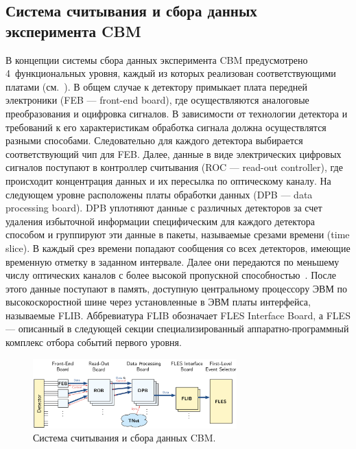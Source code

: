 \subsection{Система считывания и сбора данных эксперимента CBM}\label{sec:CBMreadout}

В концепции системы сбора данных эксперимента CBM предусмотрено 4~функциональных уровня, каждый из которых реализован соответствующими платами (см.~). В общем случае к детектору примыкает плата передней электроники (FEB --- front-end board), где осуществляются аналоговые преобразования и оцифровка сигналов.
В зависимости от технологии детектора и требований к его характеристикам обработка сигнала должна осуществлятся разными способами. Следовательно для каждого детектора выбирается соответствующий чип для FEB.
Далее, данные в виде электрических цифровых сигналов поступают в контроллер считывания (ROC --- read-out controller), где происходит концентрация данных и их пересылка по оптическому каналу. На следующем уровне расположены платы обработки данных (DPB --- data processing board). DPB уплотняют данные с различных детекторов за счет удаления избыточной информации специфическим для каждого детектора способом и группируют эти данные в пакеты, называемые срезами времени (time slice). В каждый срез времени попадают сообщения со всех детекторов, имеющие временную отметку в заданном интервале. Далее они передаются по меньшему числу оптических каналов с более высокой пропускной способностью~\cite{DPB}. После этого данные поступают в память, доступную центральному процессору ЭВМ по высокоскоростной шине через установленные в ЭВМ платы интерфейса, называемые FLIB. Аббревиатура FLIB обозначает FLES Interface Board, а FLES --- описанный в следующей секции специализированный аппаратно-программный комплекс отбора событий первого уровня.


\begin{figure}[H]
\centering
\includegraphics[width=0.7\textwidth]{pictures/CBMreadout.png}
\caption{Система считывания и сбора данных CBM.}
\label{fig:CBMreadout}
\end{figure}

